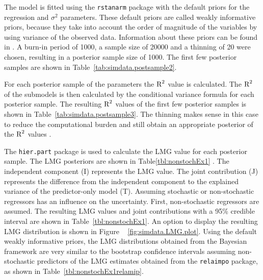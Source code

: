 \documentclass[11pt,a4paper,twoside]{book}
\begin{document}
The model is fitted using the \texttt{rstanarm} package \citep{rstanarm} with the default priors for the regression and $\sigma^2$ parameters. These default priors are called weakly informative priors, because they take into account the order of magnitude of the variables by using variance of the observed data. Information about these priors can be found in \cite{stanM2017}. A burn-in period of 1000, a sample size of 20000 and a thinning of 20 were chosen, resulting in a posterior sample size of 1000. The first few posterior samples are shown in Table~\ref{tab:simdata.postsample2}. 

For each posterior sample of the parameters the $\text{R}^2$ value is calculated. The $\text{R}^2$ of the submodels is then calculated by the conditional variance formula for each posterior sample. The resulting $\text{R}^2$ values of the first few posterior samples is shown in Table~\ref{tab:simdata.postsample3}.  The thinning makes sense in this case to reduce the computational burden and still obtain an appropriate posterior of the $\text{R}^2$ values \citep{Link2012}. 

The \texttt{hier.part} package is used to calculate the LMG value for each posterior sample. The LMG posteriors are shown in Table\ref{tbl:nonstochEx1} . The independent component (I) represents the LMG value. The joint contribution (J) represents the difference from the independent component to the explained variance of the predictor-only model (T). Assuming stochastic or non-stochastic regressors has an influence on the uncertainty. First, non-stochastic regressors are assumed. The resulting LMG values and joint contributions with a 95\% credible interval are shown in Table~\ref{tbl:nonstochEx1}. An option to display the resulting LMG distribution is shown in Figure ~ \ref{fig:simdata.LMG.plot}.  Using the default weakly informative priors, the LMG distributions obtained from the Bayesian framework are very similar to the bootstrap confidence intervals assuming non-stochastic predictors of the LMG estimates obtained from the \texttt{relaimpo} package, as shown in Table~\ref{tbl:nonstochEx1relamip}. 
\end{document}
